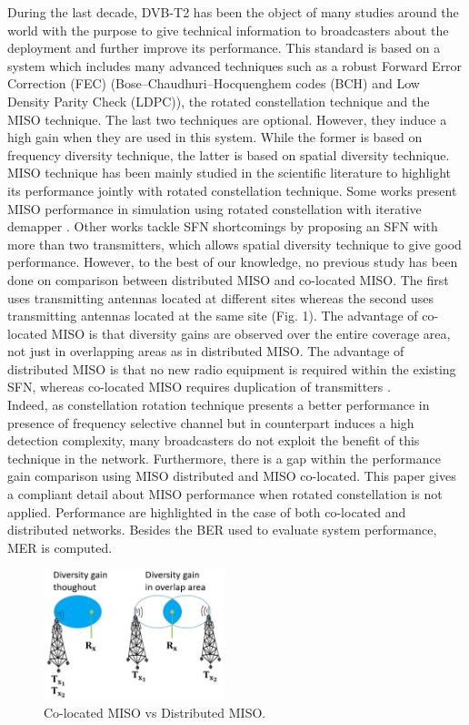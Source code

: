 \documentclass[10pt, conference]{IEEEtran}
\begin{document}
\linespread{0.98}
\normalsize{
\indent During the last decade, DVB-T2 has been the object of many studies around the world with the purpose to give technical information to broadcasters about the deployment and further improve its performance. This standard is based on a system which includes many advanced techniques such as a robust Forward Error Correction (FEC) (Bose–Chaudhuri–Hocquenghem codes (BCH) and Low Density Parity Check (LDPC)), the rotated constellation technique and the MISO technique. The last two techniques are optional. However, they induce a high gain when they are used in this system. While the former is based on frequency diversity technique, the latter is based on spatial diversity technique. MISO technique has been mainly studied in the scientific literature to highlight its performance jointly with rotated constellation technique. Some works present MISO
performance in simulation using rotated constellation with
iterative demapper \cite{3}. Other works tackle SFN shortcomings by proposing an SFN with more than two transmitters, which allows spatial diversity technique to give good performance\cite{1}. However, to the best of our knowledge, no previous study has been done on comparison between distributed MISO and co-located MISO. The first uses transmitting antennas located at different sites whereas the second uses transmitting antennas located at the same site (Fig. 1). The advantage of co-located
MISO is that diversity gains are observed over the entire
coverage area, not just in overlapping areas as in distributed MISO. The advantage of distributed MISO is that no new radio equipment is required within the existing SFN, whereas co-located MISO requires duplication of transmitters \cite{4}. \\
\indent Indeed, as constellation rotation technique presents a better performance in presence of frequency selective channel but
in counterpart induces a high detection complexity, many
broadcasters do not exploit the benefit of this technique in the network. Furthermore, there is a gap within the performance gain comparison using MISO distributed and MISO co-located. This paper gives a compliant detail about MISO performance when rotated constellation is not applied. Performance are highlighted in the case of both co-located and distributed networks. Besides the BER used to evaluate system performance, MER is computed.
}

\begin{figure}[!htbp]
 \centering
    \includegraphics[width=0.47\textwidth]{images/img_1.jpg}
    \caption{Co-located MISO vs Distributed MISO.}
\end{figure}
\end{document}
